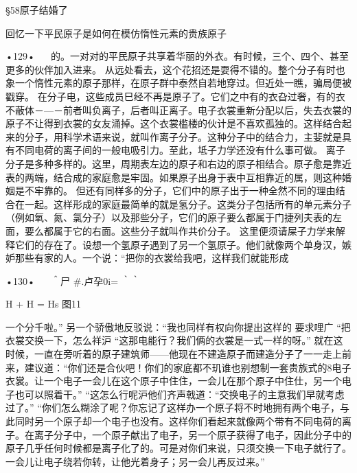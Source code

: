§58原子结婚了

回忆一下平民原子是如何在模仿惰性元素的贵族原子

•129•
  
的。一对对的平民原子共享着华丽的外衣。有时候，三个、四个、甚至更多的伙伴加入进来。
从远处看去，这个花招还是耍得不错的。整个分子有时也象一个惰性元素的原子那样，在原子群中泰然自若地穿过。但近处一瞧，骗局便被戳穿。
在分子电，这些成员巳经不再是原子了。它们之中有的衣旮过奢，有的衣不蔽体－—－前者叫负离子，后者叫正离子。电子衣裳重新分配以后，失去衣裳的原子不让得到衣裳的女友涌掉。这个衣裳槛楼的伙计是不喜欢孤独的。这样结合起来的分子，用科学术语来说，就叫作离子分子。这种分子中的结合力，主婓就是具有不同电荷的离子间的一般电吸引力。至此，坻子力学还没有什么事可做。
离子分子是多种多样的。这里，周期表左边的原子和右边的原子相结合。原子愈是靠近表的两端，结合成的家庭愈是牢固。如果原子出身于表中互相靠近的属，则这种婚姻是不牢靠的。
但还有同样多的分子，它们中的原子出于一种全然不同的理由结合在一起。这样形成的家庭最简单的就是氢分子。这类分子包括所有的单元素分子（例如氧、氮、氯分子）以及那些分子，它们的原子要么都属于门捷列夫表的左面，要么都属于它的右面。这些分子就叫作共价分子。
这里便须请屎子力学来解释它们的存在了。设想一个氢原子遇到了另一个氢原子。他们就像两个单身汉，嫉妒那些有家的人。一个说：“把你的衣裳给我吧，这样我们就能形成

•130•
  
＾尸
#.卢孕0i=
｀｀
 
 

 
	H	+	H	=	Hs
图11

一个分千啦。”
另一个骄傲地反驳说：“我也同样有权向你提出这样的
要求哩广
“把衣裳交换一下，怎么祥沪
“这那电能行？我们俩的衣裳是一式一样的呀。”
就在这时候，一直在旁听着的原子建筑师——他现在不建造原子而建造分子了一一走上前来，建议道：“你们还是合伙吧！你们的家底都不玑谁也别想制一套贵族式的8电子衣裳。让一个电子一会儿在这个原子中住住，一会儿在那个原子中住仕，另一个电子也可以照着干。”
“这怎么行呢沪他们齐声戟道：“交换电子的主意我们早就考虑过了。”
“你们怎么糊涂了呢？你忘记了这样办一个原子将不时地拥有两个电子，与此同时另一个原子却一个电子也没有。这样你们看起来就像两个带有不同电荷的离子。在离子分子中，一个原子献出了电子，另一个原子获得了电子，因此分子中的原子几乎任何时候都是离子化了的。可是对你们来说，只须交换一下电子就行了。一会儿让电子绕若你转，让他光着身子；另一会儿再反过来。”

